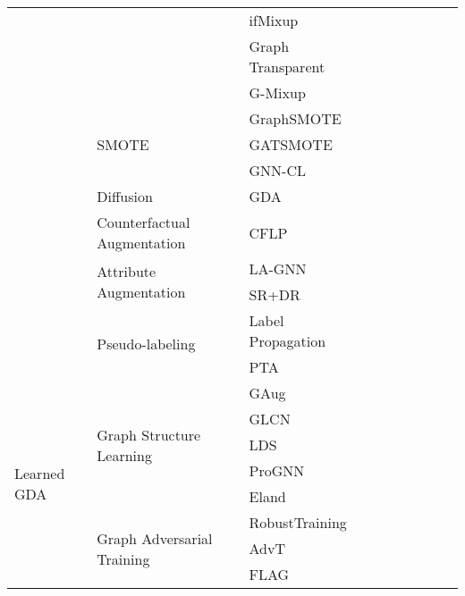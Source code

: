 \documentclass[11pt]{article}
\newcommand{\cmark}{\ding{51}}%
\begin{document}
\begin{table}[!th]
\begin{tabular}{l|l|l|ccc|ccc}
& & ifMixup~\cite{guo2021intrusion} &  & \cmark &  & \cmark & \cmark & \cmark \\
& & Graph Transparent~\cite{park2021graph} &  & \cmark &  & \cmark & \cmark & \cmark \\
& & G-Mixup~\cite{han2022G} &  & \cmark &  & \cmark & \cmark & \cmark \\
\cmidrule(lr){2-9}
& \multirow{3}{*}{SMOTE}
& GraphSMOTE~\cite{zhao2021graphsmote} & \cmark &  &  &  & \cmark &  \\
& & GATSMOTE~\cite{liu2022gatsmote} & \cmark &  &  & \cmark &  &  \\
& & GNN-CL~\cite{li2022graph} & \cmark &  &  & \cmark & \cmark &  \\
\cmidrule(lr){2-9}
& \multirow{1}{*}{Diffusion}
& GDA~\cite{klicpera2019diffusion} & \cmark &  &  & \cmark &  & \\
\cmidrule(lr){2-9}
& \multirow{1}{*}{Counterfactual Augmentation}
& CFLP~\cite{zhao2021counterfactual} &  &  & \cmark & \cmark &  & \cmark \\
\cmidrule(lr){2-9}
& \multirow{2}{*}{Attribute Augmentation}
& LA-GNN~\cite{liu2021local} & \cmark &  &  &  & \cmark &  \\
& & SR+DR~\cite{song2021topological} & \cmark &  &  &  & \cmark &  \\
\cmidrule(lr){2-9}
& \multirow{2}{*}{Pseudo-labeling}
& Label Propagation~\cite{zhu2005semi} & \cmark &  &  &  &  & \cmark \\
& & PTA~\cite{dong2021equivalence} & \cmark &  &  &  &  & \cmark \\
\midrule
\multirow{16}{*}{Learned GDA}
& \multirow{5}{*}{Graph Structure Learning}
& GAug~\cite{zhao2021data} & \cmark &  &  & \cmark &  &  \\
& & GLCN~\cite{jiang2019semi} & \cmark  &  &  & \cmark &  &  \\
& & LDS~\cite{franceschi2019learning} & \cmark  &  &  & \cmark &  &  \\
& & ProGNN~\cite{jin2020graph} & \cmark &  &  & \cmark &  &  \\
& & Eland~\cite{zhao2021action} & \cmark &  &  &  \cmark &  &  \\
\cmidrule(lr){2-9}
& \multirow{4}{*}{Graph Adversarial Training}
& RobustTraining~\cite{xu2019topology} & \cmark &  &  & \cmark &  &  \\
& & AdvT~\cite{dai2019adversarial} &\cmark  &  &\cmark  &\cmark  &  &  \\
& & FLAG~\cite{kong2022robust} & \cmark & \cmark &\cmark  &  & \cmark  &  \\

\end{tabular}
\end{table}
\end{document}
